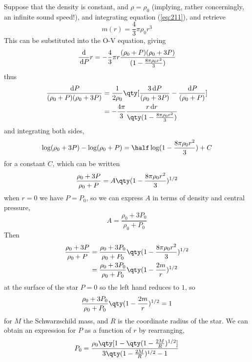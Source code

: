 Suppose that the density is constant, and $\rho=\rho_0$ (implying,
rather concerningly, an infinite sound speed!), and integrating
equation (\ref{eq:211}), and retrieve
\begin{equation}
  \label{eq:221}
  m(r) = \frac{4}{3} \pi \rho_0 r^3
\end{equation}
This can be substituted into the O-V equation, giving
\begin{equation}
  \label{eq:222}
  \frac{\mathrm{d}}{\,\mathrm{d} P}{r} = - \frac{4}{3} \pi r \frac{(\rho_0+P)(\rho_0 + 3 P)}{(1 - \frac{8 \pi \rho_0 r^2}{3})}
\end{equation}
thus
\begin{align*}
  \label{eq:223}
  \frac{\dd{P}}{(\rho_0 +P)(\rho_0 + 3P)} &= \frac{1}{2 \rho_0} \qty[\frac{3 \dd{P}}{(\rho_0 + 3P)} - \frac{\dd{P}}{(\rho_0 +P)}] \\ &= - \frac{4 \pi}{3} \frac{r \dd{r}}{\qty(1 - \frac{8 \pi \rho_0 r^2}{3})}
\end{align*}
and integrating both sides,
\begin{equation}
  \label{eq:224}
  \log( \rho_0 + 3P) - \log(\rho_0 + P) = \half \log(1 - \frac{8 \pi \rho_0 r^2}{3}) + C
\end{equation}
for a constant $C$, which can be written
\begin{equation}
  \label{eq:225}
  \frac{\rho_0 + 3P}{\rho_0+P} = A \qty( 1 - \frac{8 \pi \rho_0 r^2}{3})^{1/2}
\end{equation}
when $r=0$ we have $P=P_0$, so we can express $A$ in terms of density and central pressure,
\[ A = \frac{\rho_0 + 3 P_0}{\rho_0 +P_0} \]
Then
\begin{align}
  \label{eq:226}
  \frac{\rho_0 + 3P}{\rho_0 + P} &= \frac{\rho_0 + 3P_0}{\rho_0 + P_0}  \qty( 1 - \frac{8 \pi \rho_0 r^2}{3})^{1/2} \nonumber\\
&=  \frac{\rho_0 + 3P_0}{\rho_0 + P_0} \qty( 1 - \frac{2m}{r})^{1/2}
\end{align} at the surface of the star $P=0$ so the left hand reduces
to $1$, so
\begin{equation}
  \label{eq:227}
  \frac{\rho_0 + 3P_0}{\rho_0 + P_0} \qty( 1 - \frac{2m}{r})^{1/2} = 1
\end{equation}
for $M$ the Schwarzschild mass, and $R$ is the coordinate radius of
the star. We can obtain an expression for $P$ as a function of $r$ by rearranging,
\begin{equation}
  \label{eq:228}
  P_0 = \frac{\rho_0 \qty[ 1 - \qty( 1 - \frac{2M}{R} )^{1/2}]}{3 \qty( 1 - \frac{2M}{R})^{1/2} - 1}
\end{equation}

